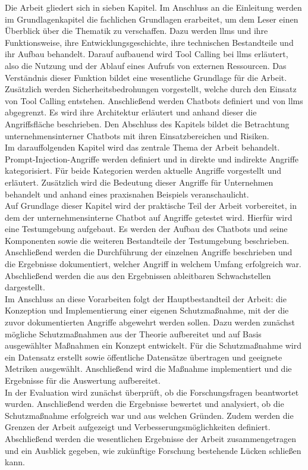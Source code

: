 Die Arbeit gliedert sich in sieben Kapitel. Im Anschluss an die Einleitung werden im Grundlagenkapitel die fachlichen Grundlagen erarbeitet, um dem Leser einen 
Überblick über die Thematik zu verschaffen. Dazu werden \acp{llm} und ihre Funktionsweise, ihre Entwicklungsgeschichte, ihre technischen Bestandteile und 
ihr Aufbau behandelt. Darauf aufbauend wird Tool Calling bei \acp{llm} erläutert, also die Nutzung und der Ablauf eines Aufrufs von externen Ressourcen. Das Verständnis
dieser Funktion bildet eine wesentliche Grundlage für die Arbeit. Zusätzlich werden Sicherheitsbedrohungen vorgestellt, welche durch den Einsatz von Tool Calling 
entstehen. Anschließend werden Chatbots definiert und von \acp{llm} abgegrenzt. Es wird ihre Architektur erläutert und anhand dieser die Angriffsfläche beschrieben.
Den Abschluss des Kapitels bildet die Betrachtung unternehmensinterner Chatbots mit ihren Einsatzbereichen und Risiken. \\
Im darauffolgenden Kapitel wird das zentrale Thema der Arbeit behandelt. Prompt-Injection-Angriffe werden definiert und in direkte und indirekte Angriffe kategorisiert.
Für beide Kategorien werden aktuelle Angriffe vorgestellt und erläutert. Zusätzlich wird die Bedeutung dieser Angriffe für Unternehmen behandelt und anhand eines
praxisnahen Beispiels veranschaulicht. \\
Auf Grundlage dieser Kapitel wird der praktische Teil der Arbeit vorbereitet, in dem der unternehmensinterne Chatbot auf Angriffe getestet wird. Hierfür wird eine 
Testumgebung aufgebaut. Es werden der Aufbau des Chatbots und seine Komponenten sowie die weiteren Bestandteile der Testumgebung beschrieben. Anschließend werden 
die Durchführung der einzelnen Angriffe beschrieben und die Ergebnisse dokumentiert, welcher Angriff in welchem Umfang erfolgreich war. Abschließend werden die aus
den Ergebnissen ableitbaren Schwachstellen dargestellt. \\
Im Anschluss an diese Vorarbeiten folgt der Hauptbestandteil der Arbeit: die Konzeption und Implementierung einer eigenen Schutzmaßnahme, mit der die zuvor dokumentierten
Angriffe abgewehrt werden sollen. Dazu werden zunächst mögliche Schutzmaßnahmen aus der Theorie aufbereitet und auf Basis ausgewählter Maßnahmen ein Konzept
entwickelt. Für die Schutzmaßnahme wird ein Datensatz erstellt sowie öffentliche Datensätze übertragen und geeignete Metriken ausgewählt. Anschließend wird die
Maßnahme implementiert und die Ergebnisse für die Auswertung aufbereitet. \\
In der Evaluation wird zunächst überprüft, ob die Forschungsfragen beantwortet wurden. Anschließend werden die Ergebnisse bewertet und analysiert, ob die Schutzmaßnahme
erfolgreich war und aus welchen Gründen. Zudem werden die Grenzen der Arbeit aufgezeigt und Verbesserungsmöglichkeiten definiert. \\
Abschließend werden die wesentlichen Ergebnisse der Arbeit zusammengetragen und ein Ausblick gegeben, wie zukünftige Forschung bestehende Lücken schließen kann.